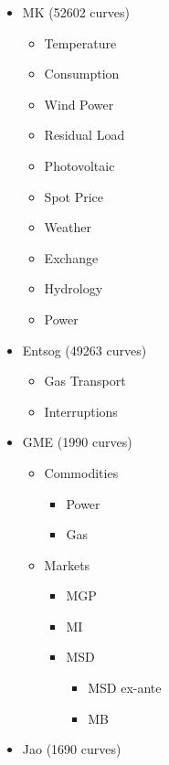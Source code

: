 \begin{itemize}
    \item MK (52602 curves)
        \begin{itemize}
            \item Temperature
            \item Consumption
            \item Wind Power
            \item Residual Load
            \item Photovoltaic
            \item Spot Price
            \item Weather
            \item Exchange
            \item Hydrology
            \item Power
        \end{itemize}
    \item Entsog (49263 curves)
        \begin{itemize}
            \item Gas Transport
            \item Interruptions
        \end{itemize}
    \item GME (1990 curves)
        \begin{itemize}
            \item Commodities
                \begin{itemize}
                    \item Power
                    \item Gas
                \end{itemize}
            \item Markets
                \begin{itemize}
                    \item MGP
                    \item MI
                    \item MSD
                        \begin{itemize}
                            \item MSD ex-ante
                            \item MB
                        \end{itemize}
                \end{itemize}
        \end{itemize}
    \item Jao (1690 curves)

\end{itemize}
